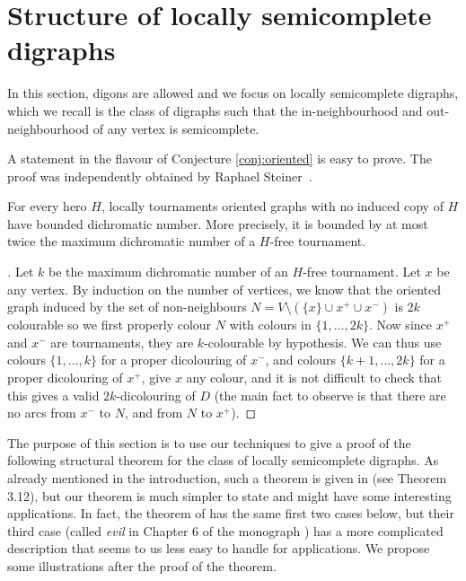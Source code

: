 

\section{Structure of locally semicomplete digraphs} \label{sec:semicomplete}

In this section, digons are allowed and we focus on locally semicomplete digraphs, which we recall is the class of digraphs such that the in-neighbourhood and out-neighbourhood of any vertex is semicomplete.%

A statement in the flavour of Conjecture \ref{conj:oriented} is easy to prove. The proof was independently obtained by Raphael Steiner~\cite{S21}. 

\begin{theorem}
For every hero $H$, locally tournaments oriented graphs with no induced copy of $H$  have bounded dichromatic number. More precisely, it is bounded by at most twice the maximum dichromatic number of a $H$-free tournament. 
\end{theorem}

\begin{proof}[]
Let $k$ be the maximum dichromatic number of an $H$-free tournament. 
Let $x$ be any vertex. By induction on the number of vertices, we know that the oriented graph induced by the set of non-neighbours $N=V\setminus (\{x\}\cup x^+ \cup x^-)$ is $2k$ colourable so we first properly colour $N$ with colours in $\{1,\ldots,2k\}$. Now since $x^+$ and $x^-$ are tournaments, they are $k$-colourable by hypothesis. We can thus use colours $\{1,\ldots,k\}$ for a proper dicolouring of $x^-$, and colours $\{k+1,\ldots,2k\}$ for a proper dicolouring of $x^+$, give $x$ any colour, and it is not difficult to check that this gives a valid $2k$-dicolouring of $D$ (the main fact to observe is that there are no arcs from $x^-$ to $N$, and from $N$ to $x^+$).
\end{proof}

The purpose of this section is to use our techniques to give a proof of the following structural theorem for the class of locally semicomplete digraphs. As already mentioned in the introduction, such a theorem is given in \cite{BGGV} (see Theorem 3.12), but our theorem is much simpler to state and might have some interesting applications. In fact, the theorem of \cite{BGGV} has the same first two cases below, but their third case (called {\em evil} in Chapter 6 of the monograph \cite{BG01}) has a more complicated description that seems to us less easy to handle for applications. We propose some illustrations after the proof of the theorem.

